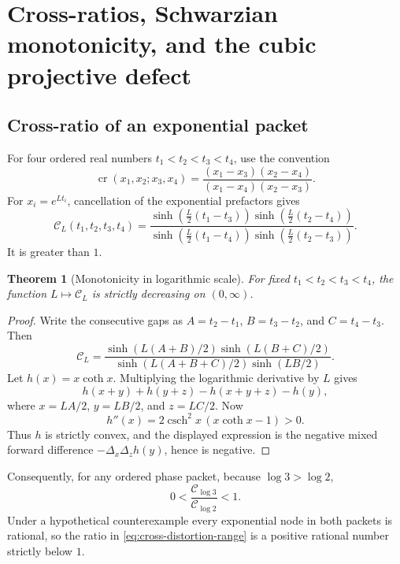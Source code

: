 \documentclass[11pt]{article}
\newtheorem{theorem}{Theorem}[section]
\theoremstyle{definition}
\theoremstyle{remark}
\newcommand{\crat}{\operatorname{cr}}
\begin{document}
\section{Cross-ratios, Schwarzian monotonicity, and the cubic projective defect}
\label{sec:crossratio}

\subsection{Cross-ratio of an exponential packet}

For four ordered real numbers $t_1<t_2<t_3<t_4$, use the convention
\begin{equation}\label{eq:crossratio}
 \crat(x_1,x_2;x_3,x_4)
 =\frac{(x_1-x_3)(x_2-x_4)}{(x_1-x_4)(x_2-x_3)}.
\end{equation}
For $x_i=e^{Lt_i}$, cancellation of the exponential prefactors gives
\begin{equation}\label{eq:cross-sinh}
 \mathcal C_L(t_1,t_2,t_3,t_4)
 =\frac{
 \sinh\!\left(\frac L2(t_1-t_3)\right)
 \sinh\!\left(\frac L2(t_2-t_4)\right)}{
 \sinh\!\left(\frac L2(t_1-t_4)\right)
 \sinh\!\left(\frac L2(t_2-t_3)\right)}.
\end{equation}
It is greater than $1$.

\begin{theorem}[Monotonicity in logarithmic scale]\label{thm:cross-monotone}
For fixed $t_1<t_2<t_3<t_4$, the function $L\mapsto\mathcal C_L$ is strictly decreasing on $(0,\infty)$.
\end{theorem}

\begin{proof}
Write the consecutive gaps as $A=t_2-t_1$, $B=t_3-t_2$, and $C=t_4-t_3$.  Then
\[
 \mathcal C_L=
 \frac{\sinh(L(A+B)/2)\sinh(L(B+C)/2)}
 {\sinh(L(A+B+C)/2)\sinh(LB/2)}.
\]
Let $h(x)=x\coth x$.  Multiplying the logarithmic derivative by $L$ gives
\[
 h(x+y)+h(y+z)-h(x+y+z)-h(y),
\]
where $x=LA/2$, $y=LB/2$, and $z=LC/2$.  Now
\[
 h''(x)=2\operatorname{csch}^2x\,(x\coth x-1)>0.
\]
Thus $h$ is strictly convex, and the displayed expression is the negative mixed forward difference $-\Delta_x\Delta_zh(y)$, hence is negative.
\end{proof}

Consequently, for any ordered phase packet, because $\log3>\log2$,
\begin{equation}\label{eq:cross-distortion-range}
 0<\frac{\mathcal C_{\log3}}{\mathcal C_{\log2}}<1.
\end{equation}
Under a hypothetical counterexample every exponential node in both packets is rational, so the ratio in \eqref{eq:cross-distortion-range} is a positive rational number strictly below $1$.
\end{document}
